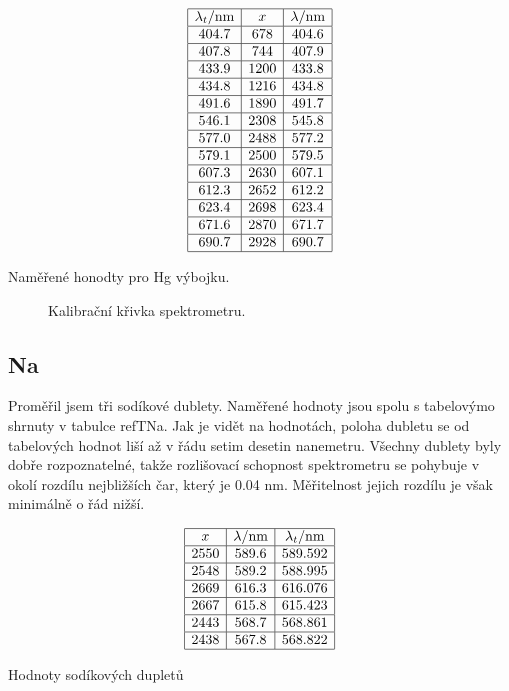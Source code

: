 \documentclass[a4paper,12pt]{article}
\begin{document}
\begin{table}
$$
\begin{array}{|c|c|c|}
\hline
\lambda_t/\mbox{nm}&    x&  \lambda/\mbox{nm} \\ \hline
404.7&  678&    404.6 \\ \hline
407.8&  744&    407.9 \\ \hline
433.9&  1200&   433.8 \\ \hline
434.8&  1216&   434.8 \\ \hline
491.6&  1890&   491.7 \\ \hline
546.1&  2308&   545.8 \\ \hline
577.0&  2488&   577.2 \\ \hline
579.1&  2500&   579.5 \\ \hline
607.3&  2630&   607.1 \\ \hline
612.3&  2652&   612.2 \\ \hline
623.4&  2698&   623.4 \\ \hline
671.6&  2870&   671.7 \\ \hline
690.7&  2928&   690.7 \\ \hline
\end{array}
$$
\caption{Naměřené honodty pro Hg výbojku.}
\label{THg}
\end{table}

\begin{figure}[h!]

\caption{Kalibrační křivka spektrometru.}
\label{GHg}
\end{figure}

\subsection{Na}
Proměřil jsem tři sodíkové dublety. Naměřené hodnoty jsou spolu s tabelovýmo shrnuty v tabulce ref{TNa}. Jak je vidět na hodnotách, poloha dubletu se od tabelových hodnot liší až v řádu setim desetin nanemetru. Všechny dublety byly dobře rozpoznatelné, takže rozlišovací schopnost spektrometru se pohybuje v okolí rozdílu nejbližších čar, který je 0.04 nm. Měřitelnost jejich rozdílu je však minimálně o řád nižší.

\begin{table}
$$
\begin{array}{|c|c|c|}
\hline
x&  \lambda/\mbox{nm}&  \lambda_t/\mbox{nm} \\ \hline
2550&   589.6&  589.592 \\ \hline
2548&   589.2&  588.995 \\ \hline
2669&   616.3&  616.076 \\ \hline
2667&   615.8&  615.423 \\ \hline
2443&   568.7&  568.861 \\ \hline
2438&   567.8&  568.822 \\ \hline
\end{array}
$$
\caption{Hodnoty sodíkových dupletů}
\label{TNa}
\end{table}
\end{document}
